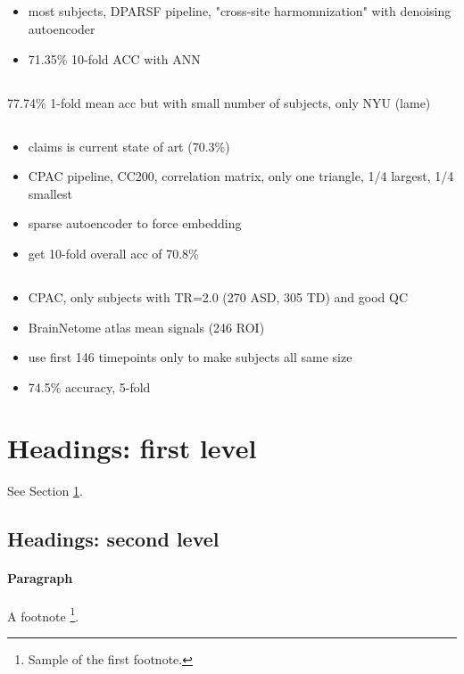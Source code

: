 \documentclass[10pt]{article}
\begin{document}
\subsection{\citet{ingalhalikarFunctionalConnectivitybasedPrediction2021}}

\begin{itemize}
  \item most subjects, DPARSF pipeline, "cross-site harmomnization" with denoising autoencoder
  \item 71.35\% 10-fold ACC with ANN
\end{itemize}

\subsection{\citet{yangLargeScaleBrainFunctional2021}}

77.74\% 1-fold mean acc but with small number of subjects, only NYU (lame)

\subsection{\citet{almuqhimASDSAENetSparseAutoencoder2021}}

\begin{itemize}
  \item claims \citet{eslamiASDDiagNetHybridLearning2019} is current state of art (70.3\%)
  \item CPAC pipeline, CC200, correlation matrix, only one triangle, 1/4 largest, 1/4 smallest
  \item sparse autoencoder to force embedding
  \item get 10-fold overall acc of 70.8\%
\end{itemize}

\subsection{\citet{byeonArtificialNeuralNetwork2020}}

\begin{itemize}
  \item CPAC, only subjects with TR=2.0 (270 ASD, 305 TD) and good QC
  \item BrainNetome atlas mean signals (246 ROI)
  \item use first 146 timepoints only to make subjects all same size
  \item 74.5\% accuracy, 5-fold
\end{itemize}

\section{Headings: first level}
\label{sec:headings}

See Section \ref{sec:headings}.

\subsection{Headings: second level}
\paragraph{Paragraph}

A footnote \footnote{Sample of the first footnote.}.



\end{document}

